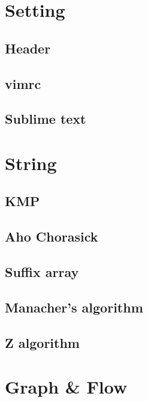 \documentclass[10pt,landscape,a4paper,twocolumn]{article}
\begin{document}
\tableofcontents

\section{Setting}
\subsection{Header}


\subsection{vimrc}


\subsection{Sublime text}


\section{String}
\subsection{KMP}


\subsection{Aho Chorasick}


\subsection{Suffix array}


\subsection{Manacher's algorithm}


\subsection{Z algorithm}



\section{Graph \& Flow}
\end{document}
